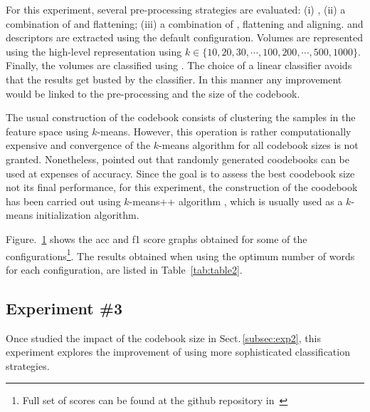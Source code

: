 For this experiment, several pre-processing strategies are evaluated: (i) \nlm, (ii) a combination of \nlm and flattening; (iii) a combination of \nlm, flattening and aligning.
\lbp and \lbptop descriptors are extracted using the default configuration.
Volumes are represented using the high-level representation \bow using $k \in \{10, 20, 30, \cdots, 100, 200, \cdots, 500, 1000\}$.
Finally, the volumes are classified using \lr. The choice of a linear classifier avoids that the results get busted by the classifier. In this manner any improvement would be linked to the pre-processing and the size of the codebook.


The usual construction of the codebook consists of clustering the samples in
the feature space using $k$-means. However, this operation is rather
computationally expensive and convergence of the $k$-means algorithm for all
codebook sizes is not granted.
Nonetheless, \citeauthor{nowak2006sampling} pointed out that randomly generated coodebooks can be used at expenses of accuracy.
Since the goal is to assess the best coodebook size not its final performance, for this experiment, the construction of the coodebook has been carried out using $k$-means++ algorithm , which is usually used as a $k$-means initialization algorithm.

Figure.~\ref{fig:RBOW} shows the \ac{acc} and \ac{f1} score graphs obtained for some of the configurations\footnote{Full set of scores can be found at the github repository in~\cite{Lemaitre2015}}.
The results obtained when using the optimum number of words for each configuration, are listed in Table~\ref{tab:table2}.

\begin{figure}[t]
  \caption{}
  \label{fig:RBOW}
\end{figure}




\subsection{Experiment \#3}\label{subsec:exp3}
Once studied the impact of the codebook size in Sect.\,\ref{subsec:exp2}, this experiment explores the improvement of using more sophisticated classification strategies.

